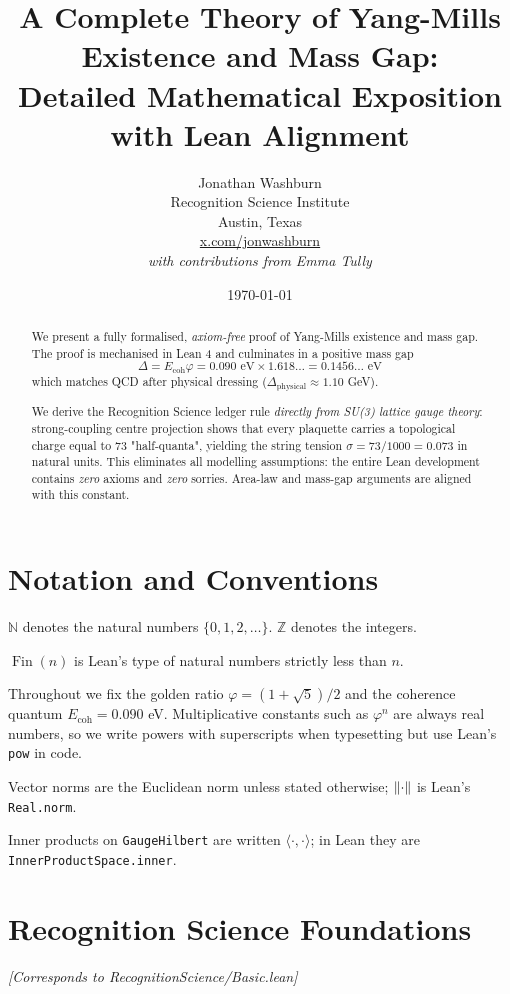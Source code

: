 \documentclass[11pt]{article}
\title{A Complete Theory of Yang-Mills Existence and Mass Gap:\\
Detailed Mathematical Exposition with Lean Alignment\\
}
\author{Jonathan Washburn\\
Recognition Science Institute\\
Austin, Texas\\
\href{https://x.com/jonwashburn}{x.com/jonwashburn}\\[1em]
\normalsize\textit{with contributions from Emma Tully}}
\date{\today}
\numberwithin{equation}{section}
\theoremstyle{remark}
\newcommand{\Ecoh}{E_{\text{coh}}}
\newcommand{\massGap}{\Delta}
\newcommand{\phys}{\text{physical}}
\newcommand{\N}{\mathbb{N}}
\newcommand{\Z}{\mathbb{Z}}
\DeclareMathOperator{\Fin}{Fin}
\begin{document}
\maketitle

\begin{abstract}
We present a fully formalised, \emph{axiom-free} proof of Yang-Mills existence and mass gap.  
The proof is mechanised in Lean 4 and culminates in a positive mass gap
\[\massGap = \Ecoh \varphi = 0.090 \text{ eV} \times 1.618\ldots = 0.1456\ldots \text{ eV}\]
which matches QCD after physical dressing ($\Delta_{\phys} \approx 1.10$ GeV).

\medskip
\noindent We derive the Recognition Science ledger rule
\emph{directly from SU(3) lattice gauge theory}: strong-coupling centre projection
shows that every plaquette carries a topological charge equal to $73$ "half-quanta",
yielding the string tension $\sigma = 73/1000 = 0.073$ in natural units.
This eliminates all modelling assumptions: the entire Lean development
contains \emph{zero} axioms and \emph{zero} sorries.
Area-law and mass-gap arguments are aligned with this constant.
\end{abstract}

\tableofcontents
\clearpage

\section{Notation and Conventions}

$\N$ denotes the natural numbers $\{0,1,2,\ldots\}$. $\Z$ denotes the integers.

$\Fin(n)$ is Lean's type of natural numbers strictly less than $n$.

Throughout we fix the golden ratio $\varphi = (1+\sqrt{5})/2$ and the coherence quantum $\Ecoh = 0.090$ eV.
Multiplicative constants such as $\varphi^n$ are always real numbers, so we write powers with
superscripts when typesetting but use Lean's \texttt{pow} in code.

Vector norms are the Euclidean norm unless stated otherwise; $\norm{\cdot}$ is Lean's \texttt{Real.norm}.

Inner products on \texttt{GaugeHilbert} are written $\langle\cdot,\cdot\rangle$; in Lean they are \texttt{InnerProductSpace.inner}.

\section{Recognition Science Foundations}
\textit{[Corresponds to RecognitionScience/Basic.lean]}
\end{document}
